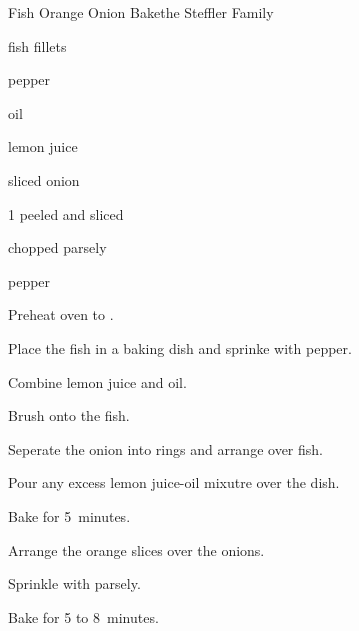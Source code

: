 \begin{recipe}{Fish Orange Onion Bake}{the Steffler Family}{}

\begin{ingredients}
\item \lbs{\half} fish fillets
\item \tp{\quarter} pepper
\item {} oil
\item {} lemon juice
\item \half sliced onion
\item 1 peeled and sliced 
\item {} chopped parsely
\item pepper
\end{ingredients}

\begin{directions}
\item Preheat oven to .
\item Place the fish in a baking dish and sprinke with pepper.
\item Combine lemon juice and oil.
\item Brush onto the fish.
\item Seperate the onion into rings and arrange over fish.
\item Pour any excess lemon juice-oil mixutre over the dish.
\item Bake for 5~minutes.
\item Arrange the orange slices over the onions.
\item Sprinkle with parsely.
\item Bake for 5 to 8~minutes.
\end{directions}
\end{recipe}
